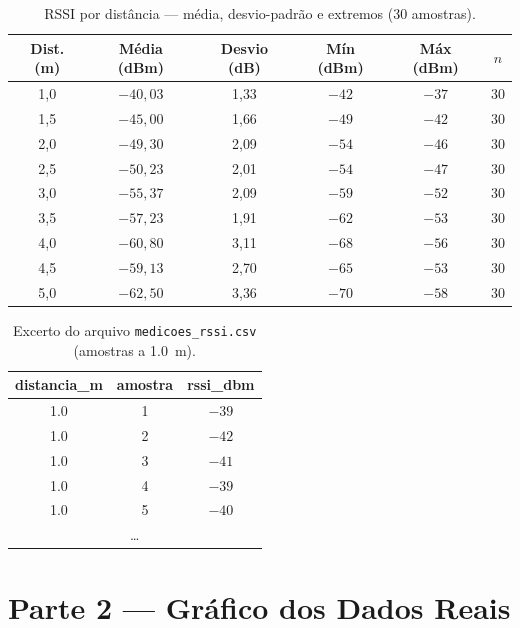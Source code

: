 \documentclass[
  12pt,
  a4paper,
  oneside,
  brazil,
  chapter=TITLE,
  section=TITLE,
]{abntex2}
\begin{document}
\begin{table}[H]
  \centering
  \caption{RSSI por dist\^ancia --- m\'edia, desvio-padr\~ao e extremos (30 amostras).}
  \label{tab:medias}
  \begin{tabular}{cccccc}
    \toprule
    \textbf{Dist. (m)} & \textbf{M\'edia (dBm)} & \textbf{Desvio (dB)} &
    \textbf{M\'in (dBm)} & \textbf{M\'ax (dBm)} & \textbf{$n$} \\
    \midrule
    1{,}0 & $-40{,}03$ & 1{,}33 & $-42$ & $-37$ & 30 \\
    1{,}5 & $-45{,}00$ & 1{,}66 & $-49$ & $-42$ & 30 \\
    2{,}0 & $-49{,}30$ & 2{,}09 & $-54$ & $-46$ & 30 \\
    2{,}5 & $-50{,}23$ & 2{,}01 & $-54$ & $-47$ & 30 \\
    3{,}0 & $-55{,}37$ & 2{,}09 & $-59$ & $-52$ & 30 \\
    3{,}5 & $-57{,}23$ & 1{,}91 & $-62$ & $-53$ & 30 \\
    4{,}0 & $-60{,}80$ & 3{,}11 & $-68$ & $-56$ & 30 \\
    4{,}5 & $-59{,}13$ & 2{,}70 & $-65$ & $-53$ & 30 \\
    5{,}0 & $-62{,}50$ & 3{,}36 & $-70$ & $-58$ & 30 \\
    \bottomrule
  \end{tabular}
\end{table}

\begin{table}[H]
  \centering
  \caption{Excerto do arquivo \texttt{medicoes\_rssi.csv} (amostras a \SI{1.0}{\meter}).}
  \label{tab:excerto}
  \small
  \begin{tabular}{ccc}
    \toprule
    \textbf{distancia\_m} & \textbf{amostra} & \textbf{rssi\_dbm} \\
    \midrule
    1.0 & 1 & $-39$ \\
    1.0 & 2 & $-42$ \\
    1.0 & 3 & $-41$ \\
    1.0 & 4 & $-39$ \\
    1.0 & 5 & $-40$ \\
    \multicolumn{3}{c}{\ldots} \\
    \bottomrule
  \end{tabular}
\end{table}

\section{Parte 2 --- Gr\'afico dos Dados Reais}
\end{document}
